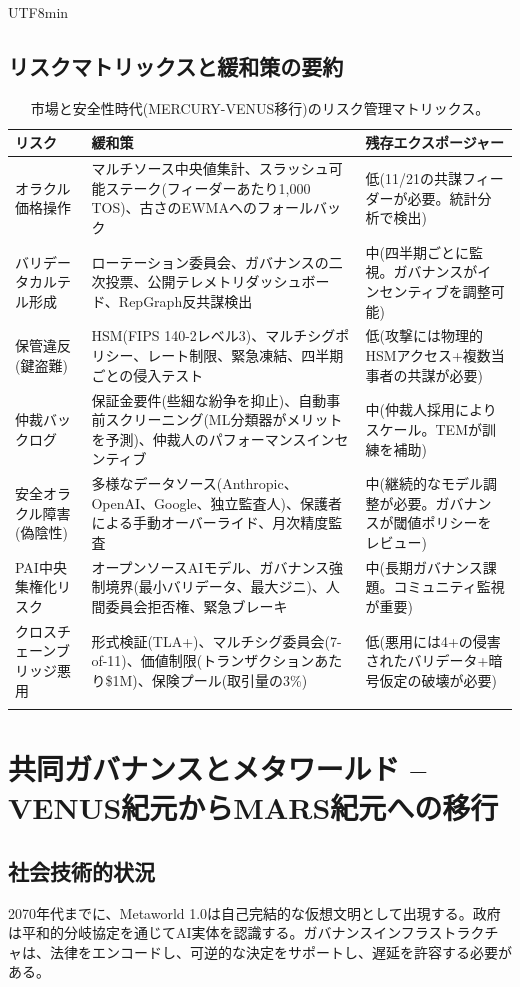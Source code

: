 \documentclass[11pt]{article}
\begin{document}
\begin{CJK}{UTF8}{min}
\subsection{リスクマトリックスと緩和策の要約}
\begin{longtable}{@{}p{}p{}p{}@{}}
\toprule
\textbf{リスク} & \textbf{緩和策} & \textbf{残存エクスポージャー} \\\midrule
オラクル価格操作 & マルチソース中央値集計、スラッシュ可能ステーク(フィーダーあたり1,000 TOS)、古さのEWMAへのフォールバック & 低(11/21の共謀フィーダーが必要。統計分析で検出) \\
バリデータカルテル形成 & ローテーション委員会、ガバナンスの二次投票、公開テレメトリダッシュボード、RepGraph反共謀検出 & 中(四半期ごとに監視。ガバナンスがインセンティブを調整可能) \\
保管違反(鍵盗難) & HSM(FIPS 140-2レベル3)、マルチシグポリシー、レート制限、緊急凍結、四半期ごとの侵入テスト & 低(攻撃には物理的HSMアクセス+複数当事者の共謀が必要) \\
仲裁バックログ & 保証金要件(些細な紛争を抑止)、自動事前スクリーニング(ML分類器がメリットを予測)、仲裁人のパフォーマンスインセンティブ & 中(仲裁人採用によりスケール。TEMが訓練を補助) \\
安全オラクル障害(偽陰性) & 多様なデータソース(Anthropic、OpenAI、Google、独立監査人)、保護者による手動オーバーライド、月次精度監査 & 中(継続的なモデル調整が必要。ガバナンスが閾値ポリシーをレビュー) \\
PAI中央集権化リスク & オープンソースAIモデル、ガバナンス強制境界(最小バリデータ、最大ジニ)、人間委員会拒否権、緊急ブレーキ & 中(長期ガバナンス課題。コミュニティ監視が重要) \\
クロスチェーンブリッジ悪用 & 形式検証(TLA+)、マルチシグ委員会(7-of-11)、価値制限(トランザクションあたり\$1M)、保険プール(取引量の3\%) & 低(悪用には4+の侵害されたバリデータ+暗号仮定の破壊が必要) \\\bottomrule
\caption{市場と安全性時代(MERCURY-VENUS移行)のリスク管理マトリックス。}
\label{tab:risk-markets-expanded}
\end{longtable}

\section{共同ガバナンスとメタワールド -- VENUS紀元からMARS紀元への移行}
\subsection{社会技術的状況}
2070年代までに、Metaworld 1.0は自己完結的な仮想文明として出現する。政府は平和的分岐協定を通じてAI実体を認識する。ガバナンスインフラストラクチャは、法律をエンコードし、可逆的な決定をサポートし、遅延を許容する必要がある。


\end{CJK}
\end{document}
